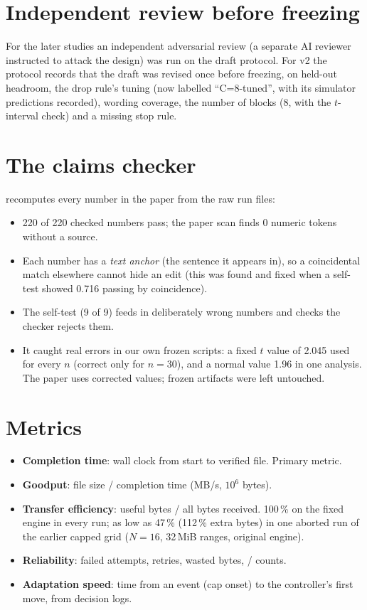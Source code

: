 \section{Independent review before freezing}
For the later studies an independent adversarial review (a separate AI reviewer instructed to attack the design) was run on the draft protocol. For v2 the protocol records that the draft was revised once before freezing, on held-out headroom, the drop rule's tuning (now labelled ``C=8-tuned'', with its simulator predictions recorded), wording coverage, the number of blocks (8, with the $t$-interval check) and a missing stop rule.

\section{The claims checker}
 recomputes every number in the paper from the raw run files:
\begin{itemize}
\item 220 of 220 checked numbers pass; the paper scan finds 0 numeric tokens without a source.
\item Each number has a \emph{text anchor} (the sentence it appears in), so a coincidental match elsewhere cannot hide an edit (this was found and fixed when a self-test showed 0.716 passing by coincidence).
\item The self-test (9 of 9) feeds in deliberately wrong numbers and checks the checker rejects them.
\item It caught real errors in our own frozen scripts: a fixed $t$ value of 2.045 used for every $n$ (correct only for $n=30$), and a normal value 1.96 in one analysis. The paper uses corrected values; frozen artifacts were left untouched.
\end{itemize}

\section{Metrics}
\begin{itemize}
\item \textbf{Completion time}: wall clock from start to verified file. Primary metric.
\item \textbf{Goodput}: file size / completion time (MB/s, $10^6$ bytes).
\item \textbf{Transfer efficiency}: useful bytes / all bytes received. 100\,\% on the fixed engine in every run; as low as 47\,\% (112\,\% extra bytes) in one aborted run of the earlier capped grid ($N=16$, 32\,MiB ranges, original engine).
\item \textbf{Reliability}: failed attempts, retries, wasted bytes, / counts.
\item \textbf{Adaptation speed}: time from an event (cap onset) to the controller's first move, from decision logs.
\end{itemize}

